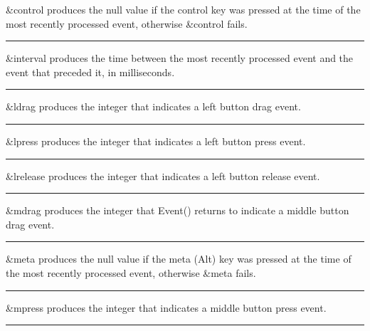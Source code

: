 \noindent
\textsf{\&control} produces the null value if the control key was
pressed at the time of the most recently processed event, otherwise
\textsf{\&control} fails.

\bigskip\hrule\vspace{0.1cm}

\noindent
\textsf{\&interval} produces the time between the most recently
processed event and the event that preceded it, in milliseconds.

\bigskip\hrule\vspace{0.1cm}

\noindent
\textsf{\&ldrag} produces the integer that indicates a left button drag
event.

\bigskip\hrule\vspace{0.1cm}

\noindent
\textsf{\&lpress} produces the integer that indicates a left button
press event.

\bigskip\hrule\vspace{0.1cm}

\noindent
\textsf{\&lrelease} produces the integer that indicates a left button
release event.

\bigskip\hrule\vspace{0.1cm}

\noindent
\textsf{\&mdrag} produces the integer that \textsf{Event()} returns to
indicate a middle button drag event.

\bigskip\hrule\vspace{0.1cm}

\noindent
\textsf{\&meta} produces the null value if the meta (Alt) key was
pressed at the time of the most recently processed event, otherwise
\textsf{\&meta} fails.

\bigskip\hrule\vspace{0.1cm}

\noindent
\textsf{\&mpress} produces the integer that indicates a middle button
press event.

\bigskip\hrule\vspace{0.1cm}

